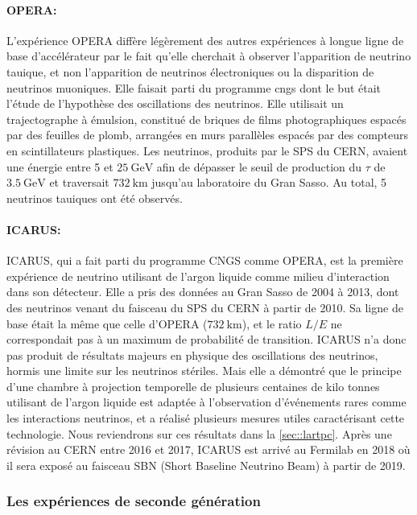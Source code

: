             \paragraph{OPERA\cite{Agafonova2018}:} L'expérience OPERA diffère légèrement des autres expériences à longue ligne de base d'accélérateur par le fait qu'elle cherchait à observer l'apparition de neutrino tauique, et non l'apparition de neutrinos électroniques ou la disparition de neutrinos muoniques. Elle faisait parti du programme \gls{cngs} dont le but était l'étude de l'hypothèse des oscillations des neutrinos. Elle utilisait un trajectographe à émulsion, constitué de  briques de films photographiques espacés par des feuilles de plomb, arrangées en murs parallèles espacés par des compteurs en scintillateurs plastiques. Les neutrinos, produits par le SPS du CERN, avaient une énergie entre 5 et $\SI{25}{\giga\electronvolt}$ afin de dépasser le seuil de production du $\tau$ de $\SI{3.5}{\giga\electronvolt}$ et traversait $\SI{732}{\kilo\meter}$ jusqu'au laboratoire du Gran Sasso. Au total, 5 neutrinos tauiques ont été observés.
            
            \paragraph{ICARUS\cite{Antonello2015}:} ICARUS, qui a fait parti du programme CNGS comme OPERA, est la première expérience de neutrino utilisant de l'argon liquide comme milieu d'interaction dans son détecteur. Elle a pris des données au Gran Sasso de 2004 à 2013, dont des neutrinos venant du faisceau  du SPS du CERN à partir de 2010. Sa ligne de base était la même que celle d'OPERA ($\SI{732}{\kilo\meter}$), et le ratio $L/E$ ne correspondait pas à un maximum de probabilité de transition. ICARUS n'a donc pas produit de résultats majeurs en physique des oscillations des neutrinos, hormis une limite sur les neutrinos stériles\cite{Antonello2013}. Mais elle a démontré que le principe d'une chambre à projection temporelle de plusieurs centaines de kilo tonnes utilisant de l'argon liquide est adaptée à l'observation d'événements rares comme les interactions neutrinos, et a réalisé plusieurs mesures utiles caractérisant cette technologie. Nous reviendrons sur ces résultats dans la \autoref{sec::lartpc}. Après une révision au CERN entre 2016 et 2017, ICARUS est arrivé au Fermilab en 2018 où il sera exposé au faisceau SBN (Short Baseline Neutrino Beam) à partir de 2019.
            
            \subsubsection{Les expériences de seconde génération}
            
